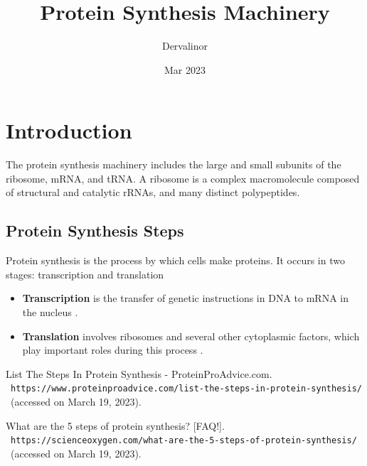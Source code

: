 \documentclass{article}
\title{Protein Synthesis Machinery}
\author{Dervalinor}
\date{Mar 2023}
\begin{document}
\maketitle

\section{Introduction}

The protein synthesis machinery includes the large and small subunits of the ribosome, 
mRNA, and tRNA. A ribosome is a complex macromolecule composed of structural and catalytic rRNAs, 
and many distinct polypeptides.

\subsection{Protein Synthesis Steps}

Protein synthesis is the process by which cells make proteins. It occurs in two stages: transcription and translation

\begin{itemize}

  \item \textbf{Transcription}  is the transfer of genetic instructions in DNA
to mRNA in the nucleus \cite{proteinsynthesis1}.
  \item \textbf{Translation} involves ribosomes and several other cytoplasmic
factors, which play important roles during this process \cite{proteinsynthesis2}.

\end{itemize}

\begin{thebibliography}{9}
  
List The Steps In Protein Synthesis - ProteinProAdvice.com. \
  \texttt{https://www.proteinproadvice.com/list-the-steps-in-protein-synthesis/} \
(accessed on March 19, 2023).

What are the 5 steps of protein synthesis? [FAQ!]. \
  \texttt{https://scienceoxygen.com/what-are-the-5-steps-of-protein-synthesis/} \
(accessed on March 19, 2023).

\end{thebibliography}
\end{document}
